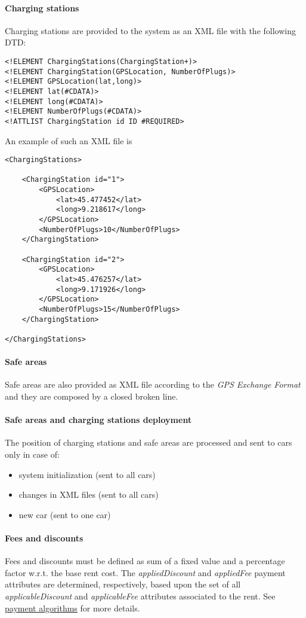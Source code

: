 \paragraph{Charging stations}Charging stations are provided to the system as an XML file with the following DTD:
\lstset{language=XML,frame=false}
\begin{lstlisting}
<!ELEMENT ChargingStations(ChargingStation+)>
<!ELEMENT ChargingStation(GPSLocation, NumberOfPlugs)>
<!ELEMENT GPSLocation(lat,long)>
<!ELEMENT lat(#CDATA)>
<!ELEMENT long(#CDATA)>
<!ELEMENT NumberOfPlugs(#CDATA)>
<!ATTLIST ChargingStation id ID #REQUIRED>
\end{lstlisting}
An example of such an XML file is 
\begin{lstlisting}
<ChargingStations>

	<ChargingStation id="1">
		<GPSLocation>
			<lat>45.477452</lat>
			<long>9.218617</long>
		</GPSLocation>
		<NumberOfPlugs>10</NumberOfPlugs>
	</ChargingStation>
	
	<ChargingStation id="2">
		<GPSLocation>
			<lat>45.476257</lat>
			<long>9.171926</long>
		</GPSLocation>
		<NumberOfPlugs>15</NumberOfPlugs>
	</ChargingStation>
	
</ChargingStations>
\end{lstlisting}

\paragraph{Safe areas}Safe areas are also provided as XML file according to the \emph{GPS Exchange Format} and they are composed by a closed broken line.

\paragraph{Safe areas and charging stations deployment}The position of charging stations and safe areas are processed and sent to cars only in case of:
\begin{itemize}
	\item system initialization (sent to all cars)
	\item changes in XML files (sent to all cars)
	\item new car (sent to one car)
\end{itemize}

\paragraph{Fees and discounts}
Fees and discounts must be defined as sum of a fixed value and a percentage factor w.r.t. the base rent cost.
The \emph{appliedDiscount} and \emph{appliedFee} payment attributes are determined, respectively, based upon the set of all \emph{applicableDiscount} and \emph{applicableFee} attributes associated to the rent. See \hyperref[sec:paymentAlgorithms]{payment algorithms} for more details.

